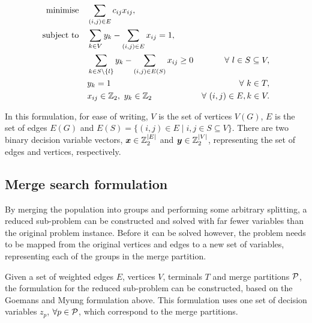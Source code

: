 \documentclass[journal]{IEEEtran}
\begin{document}
{\footnotesize
\begin{align}
\Min \quad & \displaystyle\sum_{(i,j) \in E} c_{ij}x_{ij},\label{eq:stpg_form}\\
\ST \quad & \displaystyle\sum_{k \in V}y_{k} - \displaystyle\sum_{(i,j) \in E}x_{ij} = 1,\nonumber\\
& \displaystyle\sum_{k \in S\setminus \{l\}}y_{k} - \displaystyle\sum_{(i,j) \in E(S)}x_{ij} \geq 0 & \forall\ l \in S \subseteq V,\nonumber\\
& y_k = 1 & \forall\ k \in T,\nonumber\\
& x_{ij} \in \Bin,\ y_k \in \Bin & \forall\ (i,j) \in E, k \in V\nonumber.
\end{align}
}

In this formulation, for ease of writing, \(V\) is the set of vertices \(V(G)\), \(E\) is the set of edges \(E(G)\) and \(E(S) = \{(i,j) \in E \mid i,j \in S \subseteq V\}\). There are two binary decision variable vectors, \(\V{x} \in \Bin^{|E|}\) and \(\V{y} \in \Bin^{|V|}\), representing the set of edges and vertices, respectively.

\subsection*{Merge search formulation}
By merging the population into groups and performing some arbitrary splitting, a reduced sub-problem can be constructed and solved with far fewer variables than the original problem instance. Before it can be solved however, the problem needs to be mapped from the original vertices and edges to a new set of variables, representing each of the groups in the merge partition.

Given a set of weighted edges \(E\), vertices \(V\), terminals \(T\) and merge partitions \(\S{P}\), the formulation for the reduced sub-problem can be constructed, based on the Goemans and Myung formulation above. This formulation uses one set of decision variables \(z_p\), \(\forall p \in \S{P}\), which correspond to the merge partitions.

\end{document}
